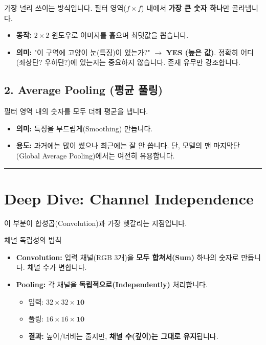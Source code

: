 \documentclass[11pt,a4paper]{book}
\theoremstyle{definition}
\begin{document}
가장 널리 쓰이는 방식입니다. 필터 영역($f \times f$) 내에서 \textbf{가장 큰 숫자 하나}만 골라냅니다.
\begin{itemize}
    \item \textbf{동작:} $2 \times 2$ 윈도우로 이미지를 훑으며 최댓값을 뽑습니다.
    \item \textbf{의미:} "이 구역에 고양이 눈(특징)이 있는가?" $\rightarrow$ \textbf{YES (높은 값)}. 정확히 어디(좌상단? 우하단?)에 있는지는 중요하지 않습니다. 존재 유무만 강조합니다.
\end{itemize}

\subsection{2. Average Pooling (평균 풀링)}


필터 영역 내의 숫자를 모두 더해 평균을 냅니다.
\begin{itemize}
    \item \textbf{의미:} 특징을 부드럽게(Smoothing) 만듭니다.
    \item \textbf{용도:} 과거에는 많이 썼으나 최근에는 잘 안 씁니다. 단, 모델의 맨 마지막단(Global Average Pooling)에서는 여전히 유용합니다.
\end{itemize}

\vspace{0.5cm}\hrule\vspace{0.5cm}

\section{Deep Dive: Channel Independence}

이 부분이 합성곱(Convolution)과 가장 헷갈리는 지점입니다.

\begin{featurebox}{채널 독립성의 법칙}
\begin{itemize}
    \item \textbf{Convolution:} 입력 채널(RGB 3개)을 \textbf{모두 합쳐서(Sum)} 하나의 숫자로 만듭니다. 채널 수가 변합니다.
    \item \textbf{Pooling:} 각 채널을 \textbf{독립적으로(Independently)} 처리합니다.
    \begin{itemize}
        \item 입력: $32 \times 32 \times \mathbf{10}$
        \item 풀링: $16 \times 16 \times \mathbf{10}$
        \item \textbf{결과:} 높이/너비는 줄지만, \textbf{채널 수(깊이)는 그대로 유지}됩니다.
    \end{itemize}
\end{itemize}
\end{featurebox}
\end{document}

